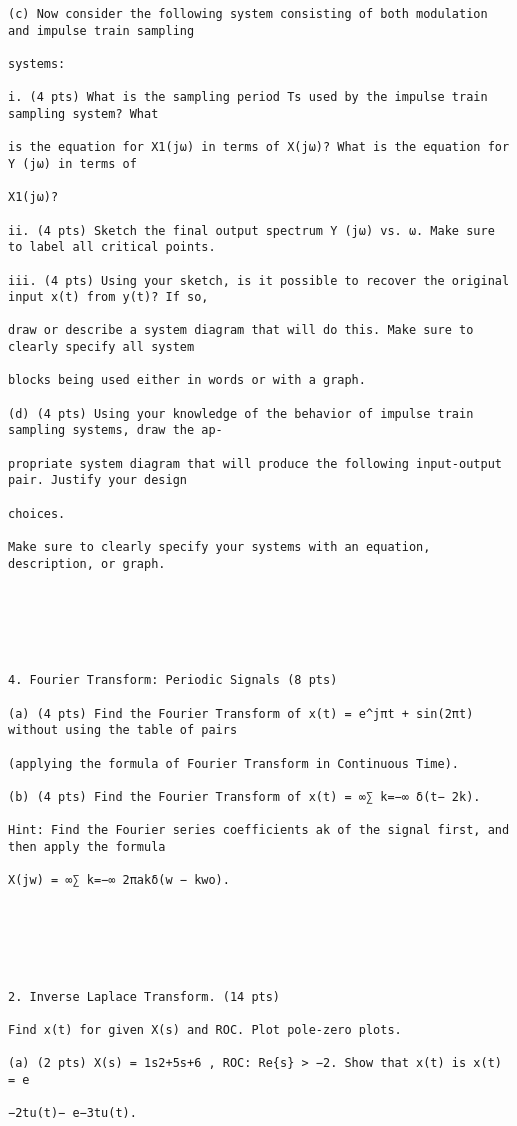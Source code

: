 \documentclass[11pt,addpoints]{exam}
\begin{document}
\begin{verbatim}
(c) Now consider the following system consisting of both modulation and impulse train sampling

systems:

i. (4 pts) What is the sampling period Ts used by the impulse train sampling system? What

is the equation for X1(jω) in terms of X(jω)? What is the equation for Y (jω) in terms of

X1(jω)?

ii. (4 pts) Sketch the final output spectrum Y (jω) vs. ω. Make sure to label all critical points.

iii. (4 pts) Using your sketch, is it possible to recover the original input x(t) from y(t)? If so,

draw or describe a system diagram that will do this. Make sure to clearly specify all system

blocks being used either in words or with a graph.

(d) (4 pts) Using your knowledge of the behavior of impulse train sampling systems, draw the ap-

propriate system diagram that will produce the following input-output pair. Justify your design

choices.

Make sure to clearly specify your systems with an equation, description, or graph.






4. Fourier Transform: Periodic Signals (8 pts)

(a) (4 pts) Find the Fourier Transform of x(t) = e^jπt + sin(2πt) without using the table of pairs

(applying the formula of Fourier Transform in Continuous Time).

(b) (4 pts) Find the Fourier Transform of x(t) = ∞∑ k=−∞ δ(t− 2k).

Hint: Find the Fourier series coefficients ak of the signal first, and then apply the formula

X(jw) = ∞∑ k=−∞ 2πakδ(w − kwo).






2. Inverse Laplace Transform. (14 pts)

Find x(t) for given X(s) and ROC. Plot pole-zero plots.

(a) (2 pts) X(s) = 1s2+5s+6 , ROC: Re{s} > −2. Show that x(t) is x(t) = e

−2tu(t)− e−3tu(t).


\end{verbatim}
\end{document}
